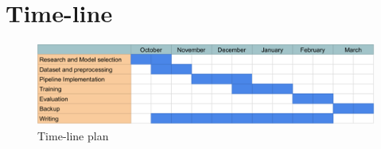 \documentclass[11pt]{article}
\begin{document}
\section{Time-line}
\begin{figure}[h]
\centering
\includegraphics[width=\textwidth]{time-table.png}
\caption{Time-line plan}
\end{figure}


\end{document}
